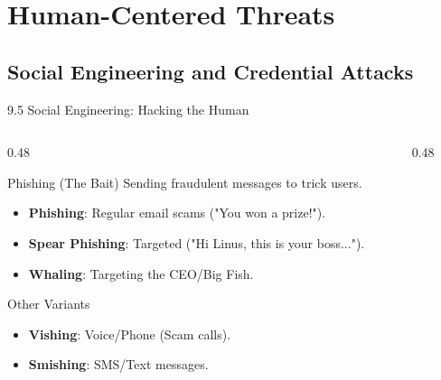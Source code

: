 \documentclass[aspectratio=169]{beamer}  %
\begin{document}
\section{Human-Centered Threats}
\subsection{Social Engineering and Credential Attacks}


\begin{frame}{9.5 Social Engineering: Hacking the Human}
    \begin{columns}[T]
        \begin{column}{0.48\textwidth}
            \begin{block}{Phishing (The Bait)}
                \footnotesize
                Sending fraudulent messages to trick users.
                \begin{itemize}
                    \item \textbf{Phishing}: Regular email scams ("You won a prize!").
                    \item \textbf{Spear Phishing}: Targeted ("Hi Linus, this is your boss...").
                    \item \textbf{Whaling}: Targeting the CEO/Big Fish.
                \end{itemize}
            \end{block}
            \begin{block}{Other Variants}
                \footnotesize
                \begin{itemize}
                    \item \textbf{Vishing}: Voice/Phone (Scam calls).
                    \item \textbf{Smishing}: SMS/Text messages.
                \end{itemize}
            \end{block}
        \end{column}
        \begin{column}{0.48\textwidth}
            \begin{center}
            \end{center}
        \end{column}
    \end{columns}
\end{frame}
\end{document}
